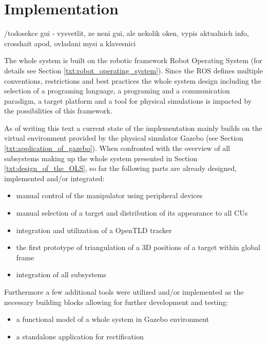 \chapter{Implementation} \label{txt:implementation}


/todo{sekce gui - vysvetlit, ze neni gui, ale nekolik oken, vypis aktualnich info, crosshait apod, ovladani mysi a klavesnici}

The whole system is built on the robotic framework Robot Operating System (for details see Section \ref{txt:robot_operating_system}). Since the ROS defines multiple conventions, restrictions and best practices the whole system design including the selection of a programing language, a programing and a communication paradigm, a target platform and a tool for physical simulations is impacted by the possibilities of this framework.

As of writing this text a current state of the implementation mainly builds on the virtual environment provided by the physical simulator Gazebo (see Section \ref{txt:application_of_gazebo}). When confronted with the overview of all subsystems making up the whole system presented in Section \ref{txt:design_of_the_OLS}, so far the following parts are already designed, implemented and/or integrated:

\begin{itemize}
	\item manual control of the manipulator using peripheral devices
	\item manual selection of a target and distribution of its appearance to all CUs
	\item integration and utilization of a OpenTLD tracker
	\item the first prototype of triangulation of a 3D positions of a target within global frame
	\item integration of all subsystems
\end{itemize}

Furthermore a few additional tools were utilized and/or implemented as the necessary building blocks allowing for further development and testing:

\begin{itemize}
	\item a functional model of a whole system in Gazebo environment
	\item a standalone application for rectification
\end{itemize}


